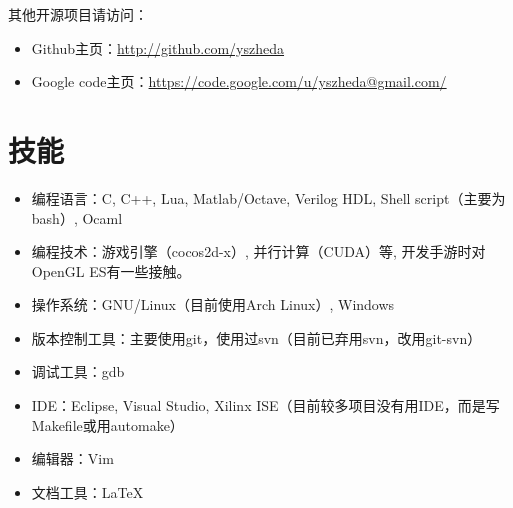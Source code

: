 \documentclass[letterpaper]{article}
\begin{document}
\begin{itemize}
\end{itemize}

其他开源项目请访问：
\begin{itemize}
  \item Github主页：\url{http://github.com/yszheda} 
  \item Google code主页：\url{https://code.google.com/u/yszheda@gmail.com/}
\end{itemize}

\section*{技能}
\begin{itemize}
\item 编程语言：C, C++, Lua, Matlab/Octave, Verilog HDL, Shell script（主要为bash）, Ocaml
\item 编程技术：游戏引擎（cocos2d-x）, 并行计算（CUDA）等, 开发手游时对OpenGL ES有一些接触。
\item 操作系统：GNU/Linux（目前使用Arch Linux）, Windows
\item 版本控制工具：主要使用git，使用过svn（目前已弃用svn，改用git-svn）
\item 调试工具：gdb
\item IDE：Eclipse, Visual Studio, Xilinx ISE（目前较多项目没有用IDE，而是写Makefile或用automake）
\item 编辑器：Vim
\item 文档工具：\LaTeX
\end{itemize}
\end{document}
